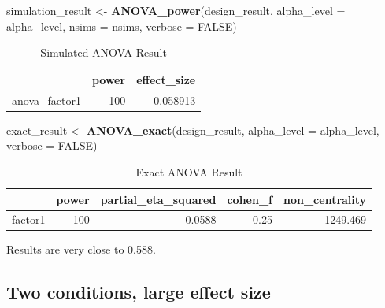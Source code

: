 \documentclass[]{book}
\newenvironment{Shaded}{\begin{snugshade}}{\end{snugshade}}
\newcommand{\DataTypeTok}[1]{\textcolor[rgb]{0.13,0.29,0.53}{#1}}
\newcommand{\KeywordTok}[1]{\textcolor[rgb]{0.13,0.29,0.53}{\textbf{#1}}}
\newcommand{\NormalTok}[1]{#1}
\newcommand{\OtherTok}[1]{\textcolor[rgb]{0.56,0.35,0.01}{#1}}
\newcommand{\StringTok}[1]{\textcolor[rgb]{0.31,0.60,0.02}{#1}}
\begin{document}
\begin{Shaded}
\begin{Highlighting}[]
\NormalTok{simulation_result <-}\StringTok{ }\KeywordTok{ANOVA_power}\NormalTok{(design_result, }
                                 \DataTypeTok{alpha_level =}\NormalTok{ alpha_level, }
                                 \DataTypeTok{nsims =}\NormalTok{ nsims,}
                                 \DataTypeTok{verbose =} \OtherTok{FALSE}\NormalTok{)}
\end{Highlighting}
\end{Shaded}

\begin{table}[t]

\caption{\label{tab:unnamed-chunk-84}Simulated ANOVA Result}
\centering
\begin{tabular}{l|r|r}
\hline
  & power & effect\_size\\
\hline
anova\_factor1 & 100 & 0.058913\\
\hline
\end{tabular}
\end{table}

\begin{Shaded}
\begin{Highlighting}[]
\NormalTok{exact_result <-}\StringTok{ }\KeywordTok{ANOVA_exact}\NormalTok{(design_result,}
                            \DataTypeTok{alpha_level =}\NormalTok{ alpha_level,}
                            \DataTypeTok{verbose =} \OtherTok{FALSE}\NormalTok{)}
\end{Highlighting}
\end{Shaded}

\begin{table}[t]

\caption{\label{tab:unnamed-chunk-86}Exact ANOVA Result}
\centering
\begin{tabular}{l|r|r|r|r}
\hline
  & power & partial\_eta\_squared & cohen\_f & non\_centrality\\
\hline
factor1 & 100 & 0.0588 & 0.25 & 1249.469\\
\hline
\end{tabular}
\end{table}

Results are very close to 0.588.

\hypertarget{two-conditions-large-effect-size}{%
\subsection{Two conditions, large effect size}\label{two-conditions-large-effect-size}}
\end{document}
